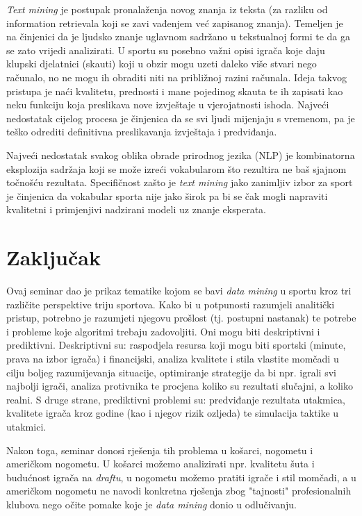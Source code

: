 \documentclass{ferseminar}
\begin{document}
\textit{Text mining} je postupak pronalaženja novog znanja iz teksta (za razliku od information retrievala koji se zavi vađenjem već zapisanog znanja). \cite{textmin} Temeljen je na činjenici da je ljudsko znanje uglavnom sadržano u tekstualnoj formi te da ga se zato vrijedi analizirati. U sportu su posebno važni opisi igrača koje daju klupski djelatnici (skauti) koji u obzir mogu uzeti daleko više stvari nego računalo, no ne mogu ih obraditi niti na približnoj razini računala. Ideja takvog pristupa je naći kvalitetu, prednosti i mane pojedinog skauta te ih zapisati kao neku funkciju koja preslikava nove izvještaje u vjerojatnosti ishoda. \cite{textminNHL} Najveći nedostatak cijelog procesa je činjenica da se svi ljudi mijenjaju s vremenom, pa je teško odrediti definitivna preslikavanja izvještaja i predviđanja.

Najveći nedostatak svakog oblika obrade prirodnog jezika (NLP) je kombinatorna eksplozija sadržaja koji se može izreći vokabularom što rezultira ne baš sjajnom točnošću rezultata. Specifičnost zašto je \textit{text mining} jako zanimljiv izbor za sport je činjenica da vokabular sporta nije jako širok pa bi se čak mogli napraviti kvalitetni i primjenjivi nadzirani modeli uz znanje eksperata.

\section{Zaključak}

Ovaj seminar dao je prikaz tematike kojom se bavi \textit{data mining} u sportu kroz tri različite perspektive triju sportova. Kako bi u potpunosti razumjeli analitički pristup, potrebno je razumjeti njegovu prošlost (tj. postupni nastanak) te potrebe i probleme koje algoritmi trebaju zadovoljiti. Oni mogu biti deskriptivni i prediktivni. Deskriptivni su: raspodjela resursa koji mogu biti sportski (minute, prava na izbor igrača) i financijski, analiza kvalitete i stila vlastite momčadi u cilju boljeg razumijevanja situacije, optimiranje strategije da bi npr. igrali svi najbolji igrači, analiza protivnika te procjena koliko su rezultati slučajni, a koliko realni. S druge strane, prediktivni problemi su: predviđanje rezultata utakmica, kvalitete igrača kroz godine (kao i njegov rizik ozljeda) te simulacija taktike u utakmici.

Nakon toga, seminar donosi rješenja tih problema u košarci, nogometu i američkom nogometu. U košarci možemo analizirati npr. kvalitetu šuta i budućnost igrača na \textit{draftu}, u nogometu možemo pratiti igrače i stil momčadi, a u američkom nogometu ne navodi konkretna rješenja zbog "tajnosti" profesionalnih klubova nego očite pomake koje je \textit{data mining} donio u odlučivanju.
\end{document}
